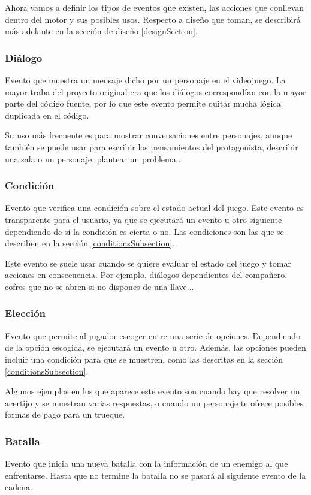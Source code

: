 Ahora vamos a definir los tipos de eventos que existen, las acciones que conllevan dentro del motor y sus posibles usos. Respecto a diseño que toman, se describirá más adelante en la sección de diseño \ref{designSection}. 

\subsubsection{Diálogo}
Evento que muestra un mensaje dicho por un personaje en el videojuego. La mayor traba del proyecto original era que los diálogos correspondían con la mayor parte del código fuente, por lo que este evento permite quitar mucha lógica duplicada en el código.

Su uso más frecuente es para mostrar conversaciones entre personajes, aunque también se puede usar para escribir los pensamientos del protagonista, describir una sala o un personaje, plantear un problema...

\subsubsection{Condición}
Evento que verifica una condición sobre el estado actual del juego. Este evento es transparente para el usuario, ya que se ejecutará un evento u otro siguiente dependiendo de si la condición es cierta o no. Las condiciones son las que se describen en la sección \ref{conditionsSubsection}.

Este evento se suele usar cuando se quiere evaluar el estado del juego y tomar acciones en consecuencia. Por ejemplo, diálogos dependientes del compañero, cofres que no se abren si no dispones de una llave...

\subsubsection{Elección}
Evento que permite al jugador escoger entre una serie de opciones. Dependiendo de la opción escogida, se ejecutará un evento u otro. Además, las opciones pueden incluir una condición para que se muestren, como las descritas en la sección \ref{conditionsSubsection}.

Algunos ejemplos en los que aparece este evento son cuando hay que resolver un acertijo y se muestran varias respuestas, o cuando un personaje te ofrece posibles formas de pago para un trueque.

\subsubsection{Batalla}
Evento que inicia una nueva batalla con la información de un enemigo al que enfrentarse.
Hasta que no termine la batalla no se pasará al siguiente evento de la cadena.

